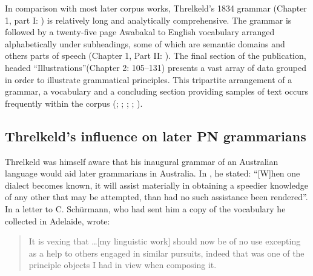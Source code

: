 In comparison with most later corpus works, Threlkeld’s 1834 grammar (Chapter 1, part I: \citeyear[1--78]{threlkeld_australian_1834}) is relatively long and analytically comprehensive. The grammar is followed by a twenty-five page Awabakal to English vocabulary arranged alphabetically under subheadings, some of which are semantic domains and others parts of speech (Chapter 1, Part II: \citeyear[79--104]{threlkeld_australian_1834}). The final section of the publication, headed “Illustrations”(Chapter 2: 105--131) presents a vast array of data grouped in order to illustrate grammatical principles. This tripartite arrangement of a grammar, a vocabulary and a concluding section providing samples of text occurs frequently within the corpus (\citealt{gunther_native_1838}; \citealt{teichelmann_outlines_1840}; \citealt{muller_grundris_1882}; \citealt{roth_structure_1901}; \citealt{planert_australische_1907}). 

\subsection{Threlkeld’s influence on later PN grammarians} 
\label{sec:key:3.3.1}

Threlkeld was himself aware that his inaugural grammar of an Australian language would aid later grammarians in Australia. In \citet[vii]{threlkeld_australian_1834}, he stated: “[W]hen one dialect becomes known, it will assist materially in obtaining a speedier knowledge of any other that may be attempted, than had no such assistance been rendered”. In a letter to C. Schürmann, who had sent him a copy of the vocabulary he collected in Adelaide, \citet{threlkeld_letter_1842} wrote: 
\begin{quote}
    It is vexing that …[my linguistic work] should now be of no use excepting as a help to others engaged in similar pursuits, indeed that was one of the principle objects I had in view when composing it.
\end{quote}


